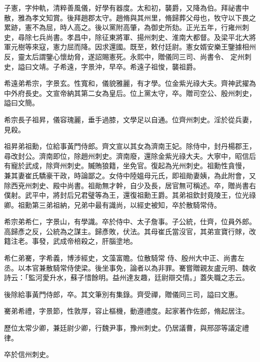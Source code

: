 \begin{pinyinscope}
 子憲，字仲軌，清粹善風儀，好學有器度。太和初，襲爵，又降為伯。拜祕書中散，雅為孝文知賞。後拜趙郡太守。趙脩與其州里，脩歸葬父母也，牧守以下畏之累跡，憲不為屈，時人高之。後以黨附高肇，為御史所劾。正光五年，行雍州刺史，尋除七兵尚書。孝昌中，除征東將軍、揚州刺史、淮南大都督。及梁平北大將軍元樹等來寇，憲力屈而降。因求還國。既至，敕付廷尉。憲女婿安樂王鑒據相州反，靈太后謂鑒心懷劫脅，遂詔賜憲死。永熙中，贈儀同三司、尚書令、
 定州刺史，謚曰文靖。子希遠，字景沖，早卒。希遠子祖悛，襲祖爵。



 希遠弟希宗，字景玄。性寬和，儀貌雅麗，有才學。位金紫光祿大夫。齊神武擢為中外府長史。文宣帝納其第二女為皇后。位上黨太守，卒。贈司空公、殷州刺史，謚曰文簡。



 希宗長子祖昇，儀容瑰麗，垂手過膝，文學足以自通。位齊州刺史。淫於從兵妻，見殺。



 祖昇弟祖勳，位給事黃門侍郎。齊文宣以其女為濟南王妃。除侍中，封丹楊郡王，尋改封公。濟南即位，除趙州刺史。濟南廢，還除金紫光祿大夫。大寧中，昭信后有寵於武成，除齊州刺史。贓賄狼籍，坐免官。復起為光州刺史。祖勳性貪慢，
 兼其妻崔氏驕豪干政，時論鄙之。女侍中陸媼母元氏，即祖勛妻姨，為此附會，又除西兗州刺史、殿中尚書。祖勛無才幹，自少及長，居官無可稱述。卒，贈尚書右僕射。武平中，將封后兄君璧等為王，還復祖勳王爵。其弟祖欽封竟陵王，位光祿卿。祖勳第三弟祖納，兄弟中最有識尚，以經史被知，卒於散騎常侍。



 希宗弟希仁，字景山，有學識。卒於侍中、太子詹事。子公統，仕齊，位員外郎。高歸彥之反，公統為之謀主。歸彥敗，伏法。其母崔氏當沒官，其弟宣寶行賕，改籍注老。事發，武成帝棓殺之，肝腦塗地。



 希仁弟騫，字希義，博涉經史，文藻富贍。位散騎常
 侍、殷州大中正、尚書左丞。以本官兼散騎常侍使梁。後坐事免，論者以為非罪。騫嘗贈親友盧元明、魏收詩云：「監河愛升水，蘇子惜餘明。益州達友趣，廷尉辯交情。」蓋失職之志云。



 後除給事黃門侍郎，卒。其文筆別有集錄。齊受禪，贈儀同三司，謚曰文惠。



 騫弟希禮，字景節，性敦厚，容止樞機，動遵禮度。起家著作佐郎，脩起居注。



 歷位太常少卿，兼廷尉少卿，行魏尹事，豫州刺史。仍居議曹，與邢邵等議定禮律。



 卒於信州刺史。




\end{pinyinscope}
